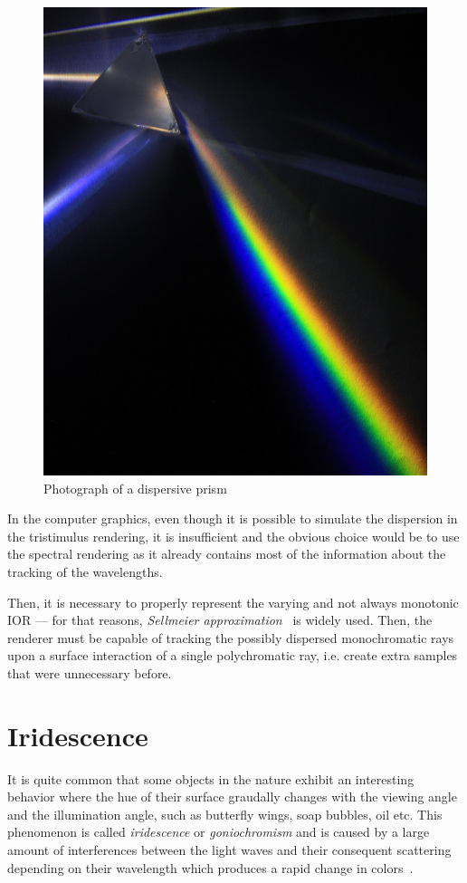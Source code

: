 \begin{figure}[h]
	\centering
	\includegraphics[width=.6\linewidth]{img/dispersion.jpg}
	\caption[nikon]{Photograph of a dispersive prism\footnotemark}
	\label{fig:dispersion}
\end{figure}

In the computer graphics, even though it is possible to simulate the dispersion in the tristimulus rendering, it is insufficient and the obvious choice would be to use the spectral rendering as it already contains most of the information about the tracking of the wavelengths. 

Then, it is necessary to properly represent the varying and not always monotonic IOR --- for that reasons, \emph{Sellmeier approximation}~\cite{wilkie2002tone} is widely used. Then, the renderer must be capable of tracking the possibly dispersed monochromatic rays upon a surface interaction of a single polychromatic ray, i.e. create extra samples that were unnecessary before.

\section{Iridescence}
\label{sec:irid}

It is quite common that some objects in the nature exhibit an interesting behavior where the hue of their surface graudally changes with the viewing angle and the illumination angle, such as butterfly wings, soap bubbles, oil etc. This phenomenon is called \emph{iridescence} or \emph{goniochromism} and is caused by a large amount of interferences between the light waves and their consequent scattering depending on their wavelength which produces a rapid change in colors~\cite{belcour2017practical}.

